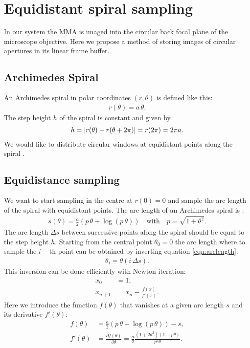\renewcommand{\(}{\left(}
\renewcommand{\)}{\right)}
\chapter{Equidistant spiral sampling}
\begin{summary}
  In our system the MMA is imaged into the circular back focal plane
  of the microscope objective. Here we propose a method of storing
  images of circular apertures in its linear frame buffer.
\end{summary}
\section{Archimedes Spiral}
An Archimedes spiral in polar coordinates $(r,\theta)$ is defined like
this:
\begin{align} \label{eqn:def}
  r(\theta)=a\,\theta.
\end{align}
The step height $h$ of the spiral is constant and given by
\begin{align}
  h=\mathopen| r(\theta)-r(\theta+2\pi) \mathclose|=r(2\pi)=2\pi a.
\end{align}
We would like to distribute circular windows at equidistant points
along the spiral \citep{Ahn1986}.
\section{Equidistance sampling}
We want to start sampling in the centre at $r(0)=0$ and sample the arc
length of the spiral with equidistant points. The arc length of an
Archimedes spiral is \citep{Weisstein}:
\begin{align} \label{eqn:arclength}
  s(\theta)=\frac{a}{2}\(p\,\theta + \log(p\,\theta)\)\quad\textrm{with}\quad
  p=\sqrt{1+\theta^2}.
\end{align}
The arc length $\Delta s$ between successive points along the spiral
should be equal to the step height $h$. Starting from the central
point $\theta_0=0$ the arc length where to sample the $i-$th point can
be obtained by inverting equation \eqref{eqn:arclength}:
\begin{align}
  \theta_i=\theta(i\,\Delta s).
\end{align}
This inversion can be done efficiently with Newton iteration:
\begin{align}
  x_0&=1,\\
  x_{n+1}&=x_n-\frac{f(x)}{f'(x)}.
\end{align}
Here we introduce the function $f(\theta)$ that vanishes at a given arc
length $s$ and its derivative $f'(\theta)$:
\begin{align}
  \label{eqn:f}
  f(\theta)&=\frac{a}{2}\(p\,\theta+\log(p\,\theta)\)-s,\\
  f'(\theta)&=\frac{\partial f(\theta)}{\partial \theta}=
  \frac{a}{2}\frac{(1+2\theta^2)(1+p\theta)}{p^2 \theta}.
\end{align}
